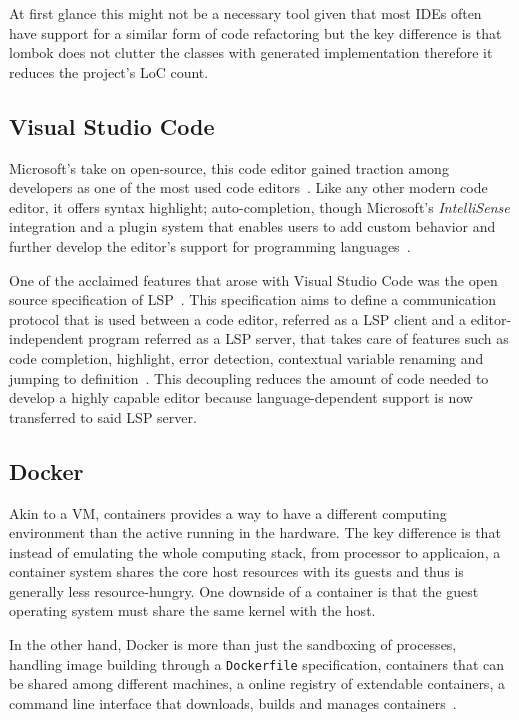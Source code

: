 At first glance this might not be a necessary tool given that most \gls{IDE}s often have support for a similar form of code refactoring but the key difference is that lombok does not clutter the classes with generated implementation therefore it reduces the project's \gls{LoC} count.

\subsection{Visual Studio Code}
Microsoft's take on open-source, this code editor gained traction among developers as one of the most used code editors~\cite{vscodesurvey}. Like any other modern code editor, it offers syntax highlight; auto-completion, though Microsoft's \textit{IntelliSense} integration and a plugin system that enables users to add custom behavior and further develop the editor's support for programming languages~\cite{vscode}.

One of the acclaimed features that arose with Visual Studio Code was the open source specification of \gls{LSP}~\cite{lsplaunch}. This specification aims to define a communication protocol that is used between a code editor, referred as a \gls{LSP} client and a editor-independent program referred as a \gls{LSP} server, that takes care of features such as code completion, highlight, error detection, contextual variable renaming and jumping to definition~\cite{lspspec}. This decoupling reduces the amount of code needed to develop a highly capable editor because language-dependent support is now transferred to said \gls{LSP} server.

\subsection{Docker}
Akin to a \gls{VM}, containers provides a way to have a different computing environment than the active running in the hardware. The key difference is that instead of emulating the whole computing stack, from processor to applicaion, a container system shares the core host resources with its guests and thus is generally less resource-hungry. One downside of a container is that the guest operating system must share the same kernel with the host.

In the other hand, Docker is more than just the sandboxing of processes, handling image building through a \texttt{Dockerfile} specification, containers that can be shared among different machines, a online registry of extendable containers, a command line interface that downloads, builds and manages containers~\cite{dockerfag}.

